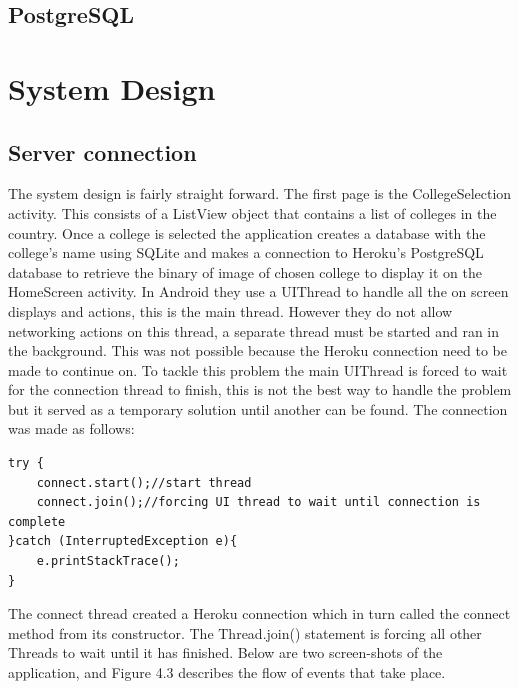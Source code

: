 \section{PostgreSQL}



\chapter{System Design}
\section{Server connection}
The system design is fairly straight forward. The first page is the CollegeSelection activity. This consists of a ListView object that contains a list of colleges in the country. Once a college is selected the application creates a database with the college's name using SQLite and makes a connection to Heroku's PostgreSQL database to retrieve the binary of image of chosen college to display it on the HomeScreen activity. In Android they use a UIThread to handle all the on screen displays and actions, this is the main thread. However they do not allow networking actions on this thread, a separate thread must be started and ran in the background. This was not possible because the Heroku connection need to be made to continue on. To tackle this problem the main UIThread is forced to wait for the connection thread to finish, this is not the best way to handle the problem but it served as a temporary solution until another can be found. The connection was made as follows:

\begin{verbatim}
try {
	connect.start();//start thread
	connect.join();//forcing UI thread to wait until connection is complete
}catch (InterruptedException e){
	e.printStackTrace();
}
\end{verbatim}

The connect thread created a Heroku connection which in turn called the connect method from its constructor. The Thread.join() statement is forcing all other Threads to wait until it has finished. Below are two screen-shots of the application, and Figure 4.3 describes the flow of events that take place.

